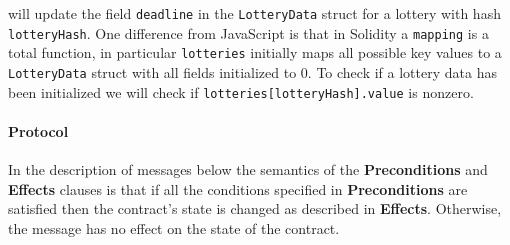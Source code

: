 \documentclass[a4paper]{article}
\begin{document}
    will update the field \texttt{deadline} in the \texttt{LotteryData} struct for a lottery with hash
    \texttt{lotteryHash}. One difference from JavaScript is that in Solidity a \texttt{mapping} is a total
    function, in particular \texttt{lotteries} initially maps all possible key values to
    a \texttt{LotteryData} struct with all fields initialized to 0. To check if a lottery data has been initialized
    we will check if \texttt{lotteries[lotteryHash].value} is nonzero.


\paragraph{Protocol}

    In the description of messages below the semantics of the \textbf{Preconditions} and \textbf{Effects} clauses is
    that if all the conditions specified in \textbf{Preconditions} are satisfied then the contract's state is changed
    as described in \textbf{Effects}. Otherwise, the message has no effect on the state of the contract.
\end{document}
